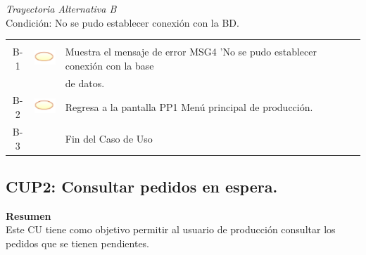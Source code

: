 \documentclass[10pt,spanish]{article}
\providecommand{\tabularnewline}{\\}
\begin{document}
	\newline 	\newline
	\textit{Trayectoria Alternativa B}\\
	Condición: No se pudo establecer conexión con la BD.\\
	\begin{tabular}{ccl}
	& & \tabularnewline
	B-1 & \includegraphics{sistema} & Muestra el mensaje de error MSG4 'No se pudo establecer conexión con la base\tabularnewline
	& & de datos.\tabularnewline
	B-2 & \includegraphics{sistema} & Regresa a la pantalla PP1 Menú principal de producción.\tabularnewline
	B-3 & & Fin del Caso de Uso\tabularnewline	
	\end{tabular}

		\newpage
		\subsection{CUP2: Consultar pedidos en espera.}

		\textbf{\large Resumen}{\large }\\
		{Este CU tiene como objetivo permitir al usuario de producción consultar los pedidos que se tienen pendientes.}\\
		{\large \par}
\end{document}
